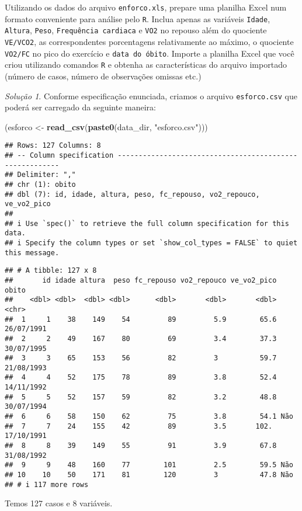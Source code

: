 \documentclass[
]{latex/krantz}
\newenvironment{Shaded}{\begin{snugshade}}{\end{snugshade}}
\newcommand{\FunctionTok}[1]{\textcolor[rgb]{0.13,0.29,0.53}{\textbf{#1}}}
\newcommand{\NormalTok}[1]{#1}
\newcommand{\OtherTok}[1]{\textcolor[rgb]{0.56,0.35,0.01}{#1}}
\newcommand{\StringTok}[1]{\textcolor[rgb]{0.31,0.60,0.02}{#1}}
\theoremstyle{definition}
\theoremstyle{definition}
\theoremstyle{definition}
\theoremstyle{definition}
\theoremstyle{remark}
\newtheorem*{solution}{Solução}
\begin{document}
Utilizando os dados do arquivo \texttt{enforco.xls}, prepare uma planilha Excel num formato conveniente para análise pelo \texttt{R}. Inclua apenas as variáveis \texttt{Idade}, \texttt{Altura}, \texttt{Peso}, \texttt{Frequência\ cardiaca} e \texttt{VO2} no repouso além do quociente \texttt{VE/VCO2}, as correspondentes porcentagens relativamente ao máximo, o quociente \texttt{VO2/FC} no pico do exercício e \texttt{data\ do\ óbito}. Importe a planilha Excel que você criou utilizando comandos \texttt{R} e obtenha as características do arquivo importado (número de casos, número de observações omissas etc.)

\begin{solution}
Conforme especificação enunciada, criamos o arquivo \texttt{esforco.csv} que poderá ser carregado da seguinte maneira:

\begin{Shaded}
\begin{Highlighting}[]
\NormalTok{(esforco }\OtherTok{\textless{}{-}} \FunctionTok{read\_csv}\NormalTok{(}\FunctionTok{paste0}\NormalTok{(data\_dir, }\StringTok{"esforco.csv"}\NormalTok{)))}
\end{Highlighting}
\end{Shaded}

\begin{verbatim}
## Rows: 127 Columns: 8
## -- Column specification --------------------------------------------------------
## Delimiter: ","
## chr (1): obito
## dbl (7): id, idade, altura, peso, fc_repouso, vo2_repouco, ve_vo2_pico
## 
## i Use `spec()` to retrieve the full column specification for this data.
## i Specify the column types or set `show_col_types = FALSE` to quiet this message.
\end{verbatim}

\begin{verbatim}
## # A tibble: 127 x 8
##       id idade altura  peso fc_repouso vo2_repouco ve_vo2_pico obito     
##    <dbl> <dbl>  <dbl> <dbl>      <dbl>       <dbl>       <dbl> <chr>     
##  1     1    38    149    54         89         5.9        65.6 26/07/1991
##  2     2    49    167    80         69         3.4        37.3 30/07/1995
##  3     3    65    153    56         82         3          59.7 21/08/1993
##  4     4    52    175    78         89         3.8        52.4 14/11/1992
##  5     5    52    157    59         82         3.2        48.8 30/07/1994
##  6     6    58    150    62         75         3.8        54.1 Não       
##  7     7    24    155    42         89         3.5       102.  17/10/1991
##  8     8    39    149    55         91         3.9        67.8 31/08/1992
##  9     9    48    160    77        101         2.5        59.5 Não       
## 10    10    50    171    81        120         3          47.8 Não       
## # i 117 more rows
\end{verbatim}

Temos 127 casos e 8 variáveis.
\end{solution}
\end{document}
